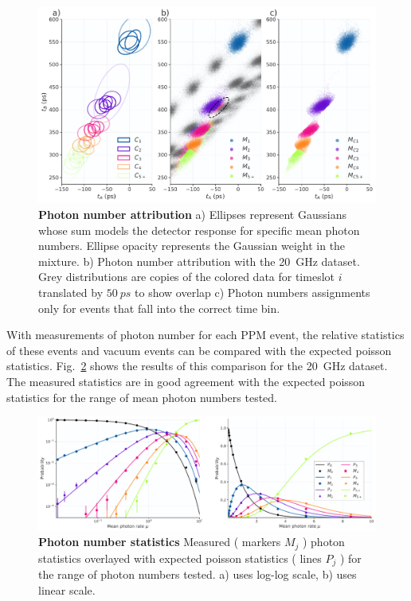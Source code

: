 \documentclass[11pt]{caltech_thesis} %
\begin{document}
\hypertarget{fig:pnr_groupings}{%
\begin{figure}
\centering
\includegraphics[width=1\textwidth,height=\textheight]{./chapter_04/figs/pnr_resolved_arrival_time_groupings_light.pdf}
\caption[{Photon number attribution}]{\textbf{Photon number attribution} a) Ellipses represent Gaussians whose sum models the detector response for specific mean photon numbers. Ellipse opacity represents the Gaussian weight in the mixture. b) Photon number attribution with the 20~GHz dataset. Grey distributions are copies of the colored data for timeslot $i$ translated by $50~ps$ to show overlap c) Photon numbers assignments only for events that fall into the correct time bin.}
\label{fig:pnr_groupings}
\end{figure}
}

With measurements of photon number for each PPM event, the relative statistics of these events and vacuum events can be compared with the expected poisson statistics. Fig.~\ref{fig:photon_statistics} shows the results of this comparison for the 20~GHz dataset. The measured statistics are in good agreement with the expected poisson statistics for the range of mean photon numbers tested.

\hypertarget{fig:photon_statistics}{%
\begin{figure}
\centering
\includegraphics[width=1\textwidth,height=\textheight]{./chapter_04/figs/pnr_stats_light.pdf}
\caption[{Photon number statistics}]{\textbf{Photon number statistics} Measured ( markers $M_j$ ) photon statistics overlayed with expected poisson statistics ( lines $P_j$ ) for the range of photon numbers tested. a) uses log-log scale, b) uses linear scale.}
\label{fig:photon_statistics}
\end{figure}
}
\end{document}
